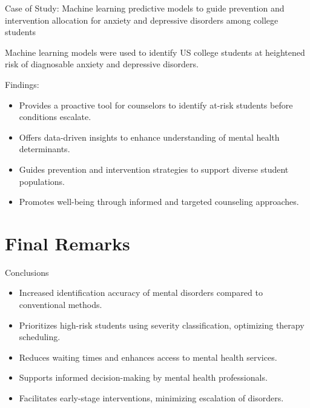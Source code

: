 \documentclass[10pt, xcolor=table]{beamer}
\let\olditem\item
\renewcommand\item{\olditem\justifying}
\begin{document}
\begin{frame}{Case of Study: Machine learning predictive models to guide prevention and intervention allocation for anxiety and depressive disorders among college students}
	
	Machine learning models were used to identify US college students at heightened risk of diagnosable anxiety and depressive disorders.
	\vspace{0.5cm}
	
	Findings:
	\begin{itemize}
		\item Provides a proactive tool for counselors to identify at-risk students before conditions escalate.
		\item Offers data-driven insights to enhance understanding of mental health determinants.
		\item Guides prevention and intervention strategies to support diverse student populations.
		\item Promotes well-being through informed and targeted counseling approaches.
	\end{itemize}
	
\end{frame}

\section*{Final Remarks}

\begin{frame}{Conclusions}
	
	\begin{tcolorbox}[width=\textwidth, colback=myNewColorB, colframe=myNewColorA, boxrule=0.7mm, rounded corners]
		\begin{itemize}
			\item Increased identification accuracy of mental disorders compared to conventional methods.
			\item Prioritizes high-risk students using severity classification, optimizing therapy scheduling.
			\item Reduces waiting times and enhances access to mental health services.
			\item Supports informed decision-making by mental health professionals.
			\item Facilitates early-stage interventions, minimizing escalation of disorders.
		\end{itemize}
	\end{tcolorbox}
	
\end{frame}
\end{document}
